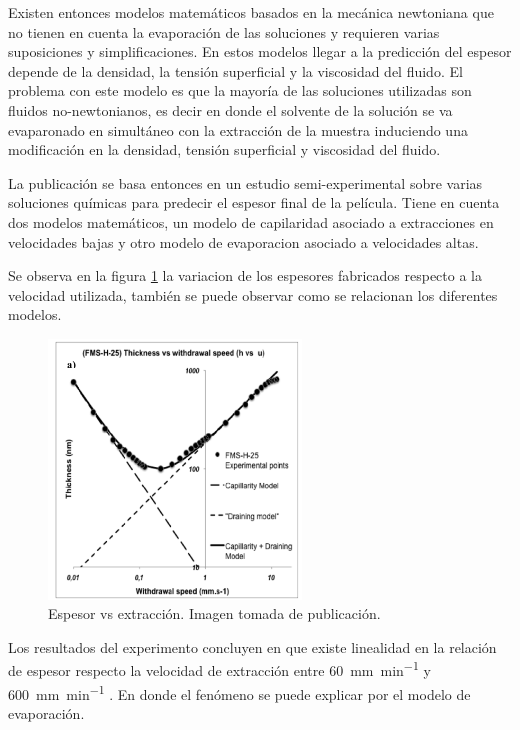 Existen entonces modelos matemáticos basados en la mecánica newtoniana que no tienen en cuenta la evaporación de las soluciones y requieren varias suposiciones y simplificaciones. En estos modelos llegar a la predicción del espesor depende de la densidad, la tensión superficial y la viscosidad del fluido. El problema con este modelo es que la mayoría de las soluciones utilizadas son fluidos no-newtonianos, es decir en donde el solvente de la solución se va evaparonado en simultáneo con la extracción de la muestra induciendo una modificación en la densidad, tensión superficial y viscosidad del fluido. 


La publicación se basa entonces en  un estudio semi-experimental sobre varias soluciones químicas para predecir el espesor final de la película. Tiene en cuenta dos modelos matemáticos, un modelo de capilaridad asociado a extracciones en velocidades bajas y otro modelo de evaporacion asociado a velocidades altas. 

Se observa en la figura \ref{fig:paper_galo} la variacion de los espesores fabricados respecto a la velocidad utilizada, también se puede observar como se relacionan los diferentes modelos. 

\begin{figure}[htpb]
\centering 
\includegraphics[width=0.6\textwidth]{./Figures/paper_galo.png}
\caption{Espesor vs extracción. Imagen tomada de publicación.}
\label{fig:paper_galo}
\end{figure}

Los resultados del experimento concluyen en que existe linealidad  en la relación de espesor respecto la velocidad de extracción entre \SI{60}{\milli\meter\per\minute} y \SI{600}{\milli\meter\per\minute} . En donde el fenómeno se puede explicar por el modelo de evaporación.


